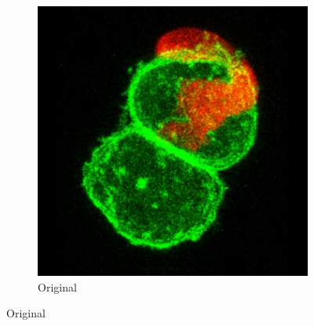 \documentclass[a4paper,11pt]{ijamas}
\begin{document}
\begin{figure}[!h]
\centering
\begin{subfigure}{.48\textwidth}
  \centering
  \includegraphics[width=0.80\columnwidth]{./figs/_2colr.jpg}
 \caption{Original \cite{cil:11996}}
  \label{fig:test_orig}
\end{subfigure}%



\end{figure}
\end{document}
